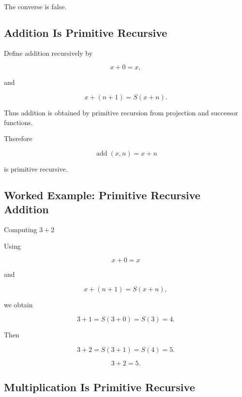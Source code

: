 The converse is false.

\subsection{Addition Is Primitive Recursive}
\label{subsec:addition-primitive-recursive}

Define addition recursively by

\[
\boxed{
x+0=x,
}
\]

and

\[
\boxed{
x+(n+1)
=
S(x+n).
}
\]

Thus addition is obtained by primitive recursion from projection and
successor functions.

Therefore

\[
\boxed{
\operatorname{add}(x,n)=x+n
}
\]

is primitive recursive.

\subsection{Worked Example: Primitive Recursive Addition}
\label{subsec:worked-primitive-recursive-addition}

\begin{workedexamplebox}{Computing \(3+2\)}

Using

\[
x+0=x
\]

and

\[
x+(n+1)=S(x+n),
\]

we obtain

\[
3+1
=
S(3+0)
=
S(3)
=
4.
\]

Then

\[
3+2
=
S(3+1)
=
S(4)
=
5.
\]

\begin{answerbox}
\[
\boxed{
3+2=5.
}
\]
\end{answerbox}

\end{workedexamplebox}

\subsection{Multiplication Is Primitive Recursive}
\label{subsec:multiplication-primitive-recursive}

